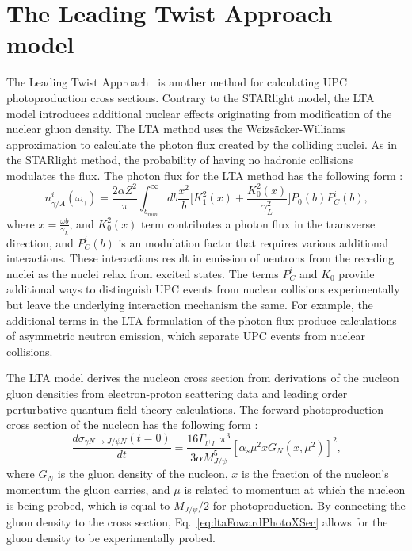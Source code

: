   \section{\label{sec:ltaTheory}The Leading Twist Approach model}
    The Leading Twist Approach~\cite{Frankfurt:2011cs,lta2011.09} is another method for calculating UPC 
      photoproduction cross sections. 
    Contrary to the STARlight model, the LTA model introduces additional 
      nuclear effects originating from modification of the nuclear gluon
      density. 
    The LTA method uses the Weizs\"{a}cker-Williams approximation to calculate 
      the photon flux created by the colliding nuclei. 
    As in the STARlight method, the probability of having no hadronic collisions 
      modulates the flux.
    The photon flux for the LTA method has the following form \cite{lta2011.09}:
    \begin{equation} \label{eq:ltaPhotonFlux}
      n_{\gamma/A}^{i}(\omega_{\gamma})=\frac{2\alpha Z^{2}}{\pi}\int_{b_{min}}^{\infty}
        db\frac{x^{2}}{b}\Big[K_{1}^{2}(x)+\frac{K_{0}^{2}(x)}{\gamma_{L}^{2}}\Big]
        P_{0}(b)P_{C}^{i}(b)\textrm{,} 
    \end{equation}
    where $x=\frac{\omega b}{\gamma_{L}}$, and $K_{0}^{2}(x)$ term contributes 
      a photon flux in the transverse direction, and $P_{C}^{i}(b)$ is an 
      modulation factor that requires various additional interactions. 
    These interactions result in emission of neutrons from the 
      receding nuclei as the nuclei relax from excited states. 
    The terms $P_{C}^{i}$ and $K_{0}$ provide additional ways to distinguish UPC
      events from nuclear collisions experimentally but leave the underlying 
      interaction mechanism the same. 
    For example, the additional terms in the LTA formulation of the photon flux
      produce calculations of asymmetric neutron emission, which separate UPC 
      events from nuclear collisions.  

    The LTA model derives the nucleon cross section from derivations
     of the nucleon gluon densities from electron-proton scattering data and
     leading order perturbative quantum field theory calculations.
    The forward photoproduction cross section of the nucleon has the following
     form \cite{lta2011.09}:
   \begin{equation} \label{eq:ltaFowardPhotoXSec}
     \frac{d\sigma_{\gamma N\rightarrow J/\psi N}(t=0)}{dt}=\frac{16\Gamma_{l^{+}l^{-}}\pi^{3}}
     {3\alpha M_{J/\psi}^{5}}[\alpha_{s}\mu^{2}xG_{N}(x,\mu^{2})]^{2}\textrm{,}
   \end{equation}
     where $G_{N}$ is the gluon density of the nucleon, $x$ is the fraction of
     the nucleon's momentum the gluon carries, and $\mu$ is related
     to momentum at which the nucleon is being probed, which is equal to 
     $M_{J/\psi}/2$ for \JPsi{} photoproduction.
   By connecting the gluon density to the cross section, Eq.~\ref{eq:ltaFowardPhotoXSec}
     allows for the gluon density to be experimentally probed. 

